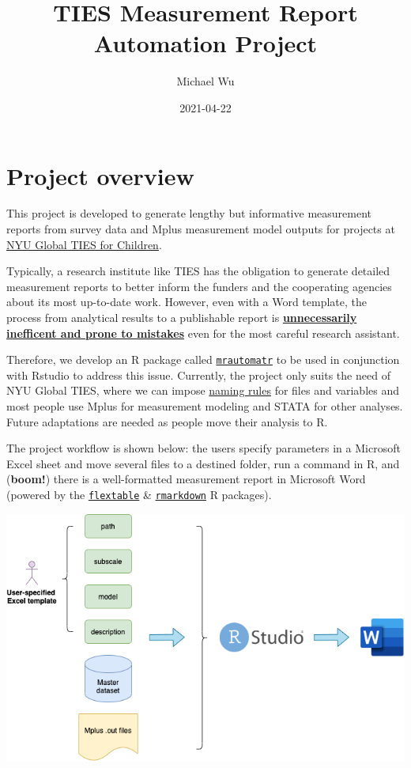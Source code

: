 \documentclass[
]{book}
\title{TIES Measurement Report Automation Project}
\author{Michael Wu}
\date{2021-04-22}
\begin{document}
\maketitle

{
\setcounter{tocdepth}{1}
\tableofcontents
}
\hypertarget{project-overview}{%
\chapter{Project overview}\label{project-overview}}

This project is developed to generate lengthy but informative measurement reports from survey data and Mplus measurement model outputs for projects at \href{https://steinhardt.nyu.edu/ihdsc/global-ties}{NYU Global TIES for Children}.

Typically, a research institute like TIES has the obligation to generate detailed measurement reports to better inform the funders and the cooperating agencies about its most up-to-date work. However, even with a Word template, the process from analytical results to a publishable report is \underline{\textbf{unnecessarily inefficent and prone to mistakes}} even for the most careful research assistant.

Therefore, we develop an R package called \href{https://github.com/nyuglobalties/mrautomatr}{\texttt{mrautomatr}} to be used in conjunction with Rstudio to address this issue. Currently, the project only suits the need of NYU Global TIES, where we can impose \href{https://nyu.box.com/s/ate5l7wmw164u7xjg3g8x1vrfhwnt0ax}{naming rules} for files and variables and most people use Mplus for measurement modeling and STATA for other analyses. Future adaptations are needed as people move their analysis to R.

The project workflow is shown below: the users specify parameters in a Microsoft Excel sheet and move several files to a destined folder, run a command in R, and (\textbf{boom!}) there is a well-formatted measurement report in Microsoft Word (powered by the \href{https://davidgohel.github.io/flextable/}{\texttt{flextable}} \& \href{https://bookdown.org/yihui/rmarkdown/}{\texttt{rmarkdown}} R packages).

\begin{center}\includegraphics[width=0.66\linewidth]{images/mrautomatr_diagram} \end{center}
\end{document}
